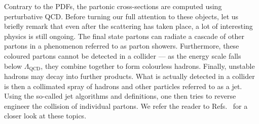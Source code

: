 \documentclass[main.tex]{subfiles}
\begin{document}
Contrary to the PDFs, the partonic cross-sections are computed using perturbative QCD. Before turning our full attention to these objects, let us briefly remark that even after the scattering has taken place, a lot of interesting physics is still ongoing. The final state partons can radiate a cascade of other partons in a phenomenon referred to as parton showers. Furthermore, these coloured partons cannot be detected in a collider --- as the energy scale falls below $\Lambda_\text{QCD}$, they combine together to form colourless hadrons. Finally, unstable hadrons may decay into further products. What is actually detected in a collider is then a collimated spray of hadrons and other particles referred to as a jet. Using the so-called jet algorithms and definitions, one then tries to reverse engineer the collision of individual partons. We refer the reader to Refs.~\cite{Plehn:2009nd, Hoche:2014rga} for a closer look at these topics.
\end{document}
